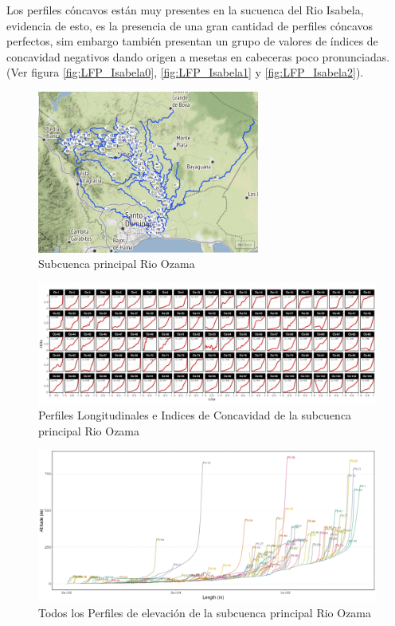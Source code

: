 \documentclass[11pt,]{article}
\begin{document}
Los perfiles cóncavos están muy presentes en la sucuenca del Rio
Isabela, evidencia de esto, es la presencia de una gran cantidad de
perfiles cóncavos perfectos, sim embargo también presentan un grupo de
valores de índices de concavidad negativos dando origen a mesetas en
cabeceras poco pronunciadas.(Ver figura \ref{fig:LFP_Isabela0},
\ref{fig:LFP_Isabela1} y \ref{fig:LFP_Isabela2}).

\begin{figure}
\centering
\includegraphics[width=0.65000\textwidth]{Productos Generados/Perfil1.png}
\caption{\label{fig:LFP_Ozama0} Subcuenca principal Rio Ozama}
\end{figure}

\begin{figure}
\centering
\includegraphics[width=1.00000\textwidth]{Productos Generados/perfiles_adimensionales_indices_de_concavidad.jpeg}
\caption{\label{fig:LFP_Ozama1} Perfiles Longitudinales e Indices de
Concavidad de la subcuenca principal Rio Ozama}
\end{figure}

\begin{figure}
\centering
\includegraphics[width=1.00000\textwidth]{Productos Generados/perfiles_todos_juntos.jpeg}
\caption{\label{fig:LFP_Ozama2} Todos los Perfiles de elevación de la
subcuenca principal Rio Ozama}
\end{figure}
\end{document}
